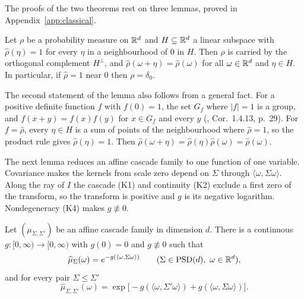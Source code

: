 The proofs of the two theorems rest on three lemmas, proved in Appendix~\ref{app:classical}.

\begin{lemma}\label{lem:charfn-one-on-subspace}
Let $\rho$ be a probability measure on $\mathbb{R}^d$ and $H \subseteq \mathbb{R}^d$ a linear subspace with
$\widehat\rho(\eta) = 1$ for every $\eta$ in a neighbourhood of $0$ in $H$. Then $\rho$ is carried
by the orthogonal complement $H^\perp$, and $\widehat\rho(\omega + \eta) = \widehat\rho(\omega)$ for all
$\omega \in \mathbb{R}^d$ and $\eta \in H$. In particular, if $\widehat\rho = 1$ near $0$ then
$\rho = \delta_0$.
\end{lemma}

The second statement of the lemma also follows from a general fact. For a positive definite function
$f$ with $f(0) = 1$, the set $G_f$ where $|f| = 1$ is a group, and $f(x + y) = f(x)f(y)$ for
$x \in G_f$ and every $y$ (, Cor.~1.4.13, p.~29). For $f = \widehat\rho$,
every $\eta \in H$ is a sum of points of the neighbourhood where $\widehat\rho = 1$, so the product rule
gives $\widehat\rho(\eta) = 1$. Then $\widehat\rho(\omega + \eta) = \widehat\rho(\eta)\widehat\rho(\omega) =
\widehat\rho(\omega)$.

The next lemma reduces an affine cascade family to one function of one variable. Covariance makes the kernels from scale zero depend on $\Sigma$ through $\langle\omega,\Sigma\omega\rangle$. Along the ray of $I$ the
cascade (K1) and continuity (K2) exclude a first zero of the transform, so the transform is positive
and $g$ is its negative logarithm. Nondegeneracy (K4) makes $g \not\equiv 0$.

\begin{lemma}\label{lem:affine-reduction}
Let $(\mu_{\Sigma,\Sigma'})$ be an affine cascade family in dimension $d$. There is a continuous
$g : [0,\infty) \to [0,\infty)$ with $g(0) = 0$ and $g \not\equiv 0$ such that
\begin{equation}\label{eq:affine-reduction}
  \widehat\mu_\Sigma(\omega) = e^{-g(\langle\omega,\Sigma\omega\rangle)}
  \qquad (\Sigma \in \mathrm{PSD}(d),\ \omega \in \mathbb{R}^d),
\end{equation}
and for every pair $\Sigma \le \Sigma'$
\begin{equation}\label{eq:affine-increment}
  \widehat\mu_{\Sigma,\Sigma'}(\omega)
   = \exp\bigl[-g(\langle\omega,\Sigma'\omega\rangle) + g(\langle\omega,\Sigma\omega\rangle)\bigr] .
\end{equation}
\end{lemma}


